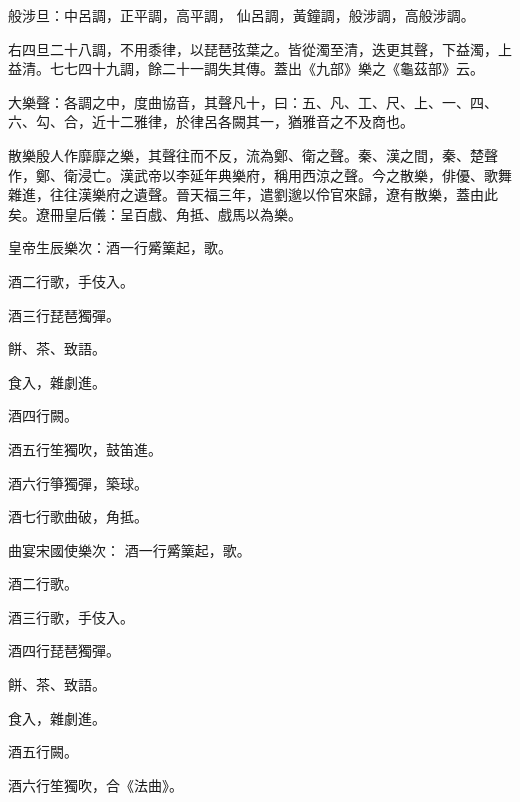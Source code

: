 \begin{pinyinscope}
 般涉旦：中呂調，正平調，高平調，
 仙呂調，黃鐘調，般涉調，高般涉調。



 右四旦二十八調，不用黍律，以琵琶弦葉之。皆從濁至清，迭更其聲，下益濁，上益清。七七四十九調，餘二十一調失其傳。蓋出《九部》樂之《龜茲部》云。



 大樂聲：各調之中，度曲協音，其聲凡十，曰：五、凡、工、尺、上、一、四、六、勾、合，近十二雅律，於律呂各闕其一，猶雅音之不及商也。



 散樂殷人作靡靡之樂，其聲往而不反，流為鄭、衛之聲。秦、漢之間，秦、楚聲作，鄭、衛浸亡。漢武帝以李延年典樂府，稱用西涼之聲。今之散樂，俳優、歌舞雜進，往往漢樂府之遺聲。晉天福三年，遣劉邈以伶官來歸，遼有散樂，蓋由此矣。遼冊皇后儀：呈百戲、角抵、戲馬以為樂。



 皇帝生辰樂次：酒一行觱篥起，歌。



 酒二行歌，手伎入。



 酒三行琵琶獨彈。



 餅、茶、致語。



 食入，雜劇進。



 酒四行闕。



 酒五行笙獨吹，鼓笛進。



 酒六行箏獨彈，築球。



 酒七行歌曲破，角抵。



 曲宴宋國使樂次：
 酒一行觱篥起，歌。



 酒二行歌。



 酒三行歌，手伎入。



 酒四行琵琶獨彈。



 餅、茶、致語。



 食入，雜劇進。



 酒五行闕。



 酒六行笙獨吹，合《法曲》。




\end{pinyinscope}
